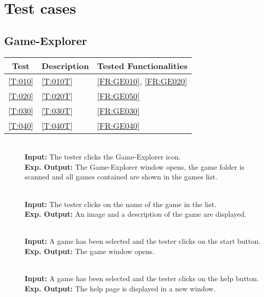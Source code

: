 \section{Test cases}

\subsection{Game-Explorer}

\begin{tabular}{cll}

\hline
\textbf{Test} & \textbf{Description} & \textbf{Tested Functionalities} \\
\hline
\ref{T:010} & \ref{T:010T} & \ref{FR:GE010}, \ref{FR:GE020} \\
\ref{T:020} & \ref{T:020T} & \ref{FR:GE050} \\
\ref{T:030} & \ref{T:030T} & \ref{FR:GE030} \\
\ref{T:040} & \ref{T:040T} & \ref{FR:GE040} \\
\hline

\end{tabular}

\begin{description}
	\item[] \textbf{} \\
	\textbf{Input:} The tester clicks the Game-Explorer icon. \\
	\textbf{Exp. Output:} The Game-Explorer window opens, the game folder is scanned and all games contained are shown in the games list.
	
	\item[] \textbf{} \\
	\textbf{Input:} The tester clicks on the name of the game in the list. \\
	\textbf{Exp. Output:} An image and a description of the game are displayed.
	
	\item[] \textbf{} \\
	\textbf{Input:} A game has been selected and the tester clicks on the start button. \\
	\textbf{Exp. Output:} The game window opens.
	
	\item[] \textbf{} \\
	\textbf{Input:} A game has been selected and the tester clicks on the help button. \\
	\textbf{Exp. Output:} The help page is displayed in a new window.
	
\end{description}

